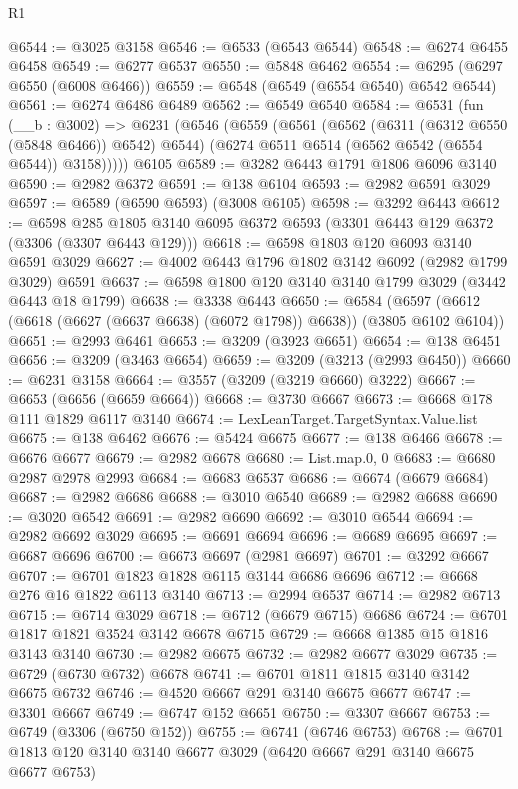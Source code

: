\begin{lexlean}{R1}
\begin{coremodule}
@6544 := @3025 @3158
@6546 := @6533 (@6543 @6544)
@6548 := @6274 @6455 @6458
@6549 := @6277 @6537
@6550 := @5848 @6462
@6554 := @6295 (@6297 @6550 (@6008 @6466))
@6559 := @6548 (@6549 (@6554 @6540) @6542 @6544)
@6561 := @6274 @6486 @6489
@6562 := @6549 @6540
@6584 := @6531
    (fun (__b : @3002) =>
    @6231
      (@6546
        (@6559
          (@6561
            (@6562 (@6311 (@6312 @6550 (@5848 @6466)) @6542) @6544)
            (@6274 @6511 @6514 (@6562 @6542 (@6554 @6544)) @3158)))))
    @6105
@6589 := @3282 @6443 @1791 @1806 @6096 @3140
@6590 := @2982 @6372
@6591 := @138 @6104
@6593 := @2982 @6591 @3029
@6597 := @6589 (@6590 @6593) (@3008 @6105)
@6598 := @3292 @6443
@6612 := @6598
    @285
    @1805
    @3140
    @6095
    @6372
    @6593
    (@3301 @6443 @129 @6372 (@3306 (@3307 @6443 @129)))
@6618 := @6598 @1803 @120 @6093 @3140 @6591 @3029
@6627 := @4002 @6443 @1796 @1802 @3142 @6092 (@2982 @1799 @3029) @6591
@6637 := @6598 @1800 @120 @3140 @3140 @1799 @3029 (@3442 @6443 @18 @1799)
@6638 := @3338 @6443
@6650 := @6584 (@6597 (@6612 (@6618 (@6627 (@6637 @6638) (@6072 @1798)) @6638)) (@3805 @6102 @6104))
@6651 := @2993 @6461
@6653 := @3209 (@3923 @6651)
@6654 := @138 @6451
@6656 := @3209 (@3463 @6654)
@6659 := @3209 (@3213 (@2993 @6450))
@6660 := @6231 @3158
@6664 := @3557 (@3209 (@3219 @6660) @3222)
@6667 := @6653 (@6656 (@6659 @6664))
@6668 := @3730 @6667
@6673 := @6668 @178 @111 @1829 @6117 @3140
@6674 := LexLeanTarget.TargetSyntax.Value.list
@6675 := @138 @6462
@6676 := @5424 @6675
@6677 := @138 @6466
@6678 := @6676 @6677
@6679 := @2982 @6678
@6680 := List.map.{0, 0}
@6683 := @6680 @2987 @2978 @2993
@6684 := @6683 @6537
@6686 := @6674 (@6679 @6684)
@6687 := @2982 @6686
@6688 := @3010 @6540
@6689 := @2982 @6688
@6690 := @3020 @6542
@6691 := @2982 @6690
@6692 := @3010 @6544
@6694 := @2982 @6692 @3029
@6695 := @6691 @6694
@6696 := @6689 @6695
@6697 := @6687 @6696
@6700 := @6673 @6697 (@2981 @6697)
@6701 := @3292 @6667
@6707 := @6701 @1823 @1828 @6115 @3144 @6686 @6696
@6712 := @6668 @276 @16 @1822 @6113 @3140
@6713 := @2994 @6537
@6714 := @2982 @6713
@6715 := @6714 @3029
@6718 := @6712 (@6679 @6715) @6686
@6724 := @6701 @1817 @1821 @3524 @3142 @6678 @6715
@6729 := @6668 @1385 @15 @1816 @3143 @3140
@6730 := @2982 @6675
@6732 := @2982 @6677 @3029
@6735 := @6729 (@6730 @6732) @6678
@6741 := @6701 @1811 @1815 @3140 @3142 @6675 @6732
@6746 := @4520 @6667 @291 @3140 @6675 @6677
@6747 := @3301 @6667
@6749 := @6747 @152 @6651
@6750 := @3307 @6667
@6753 := @6749 (@3306 (@6750 @152))
@6755 := @6741 (@6746 @6753)
@6768 := @6701 @1813 @120 @3140 @3140 @6677 @3029 (@6420 @6667 @291 @3140 @6675 @6677 @6753)

\end{coremodule}
\end{lexlean}
